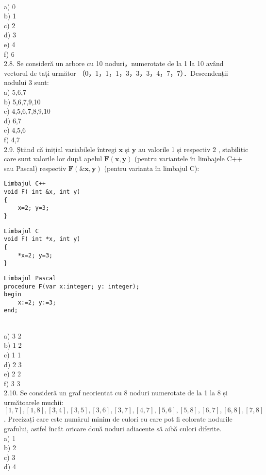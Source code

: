\\
a) 0
\\
b) 1
\\
c) 2
\\
d) 3
\\
e) 4
\\
f) 6
\\
2.8. Se consideră un arbore cu 10 noduri，numerotate de la 1 la 10 având vectorul de tați următor （0，1，1，1，3，3，3，4，7，7）．Descendenții nodului 3 sunt:
\\
a) 5,6,7
\\
b) 5,6,7,9,10
\\
c) 4,5,6,7,8,9,10
\\
d) 6,7
\\
e) 4,5,6
\\
f) 4,7
\\
2.9. Știind că inițial variabilele întregi $\mathbf{x}$ și $\mathbf{y}$ au valorile 1 și respectiv 2 , stabilițic care sunt valorile lor după apelul $\mathbf{F}(\mathbf{x}, \mathbf{y})$ (pentru variantele în limbajele C++ sau Pascal) respectiv $\mathbf{F}(\& \mathbf{x}, \mathbf{y})$ (pentru varianta în limbajul C):
\begin{verbatim}
Limbajul C++
void F( int &x, int y)
{
    x=2; y=3;
}
\end{verbatim}
\begin{verbatim}
Limbajul C
void F( int *x, int y)
{
    *x=2; y=3;
}
\end{verbatim}
\begin{verbatim}
Limbajul Pascal
procedure F(var x:integer; y: integer);
begin
    x:=2; y:=3;
end;
\end{verbatim}
\\
a) 3 2
\\
b) 1 2
\\
c) 1 1
\\
d) 2 3
\\
e) 2 2
\\
f) 3 3
\\
2.10. Se consideră un graf neorientat cu 8 noduri numerotate de la 1 la 8 și următoarele muchii: $[1,7],[1,8],[3,4],[3,5],[3,6],[3,7],[4,7],[5,6],[5,8],[6,7],[6,8],[7,8]$. Precizați care este numărul minim de culori cu care pot fi colorate nodurile grafului, astfel încât oricare două noduri adiacente să aibă culori diferite.
\\
a) 1
\\
b) 2
\\
c) 3
\\
d) 4
\\

